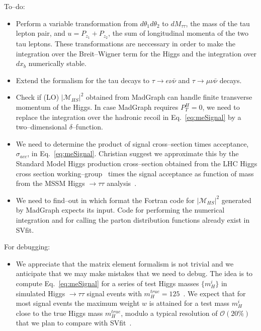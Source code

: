 To--do:
\begin{itemize}
\item Perform a variable transformation from $d\theta_{1} d\theta_{2}$ to $dM_{\tau\tau}$, the mass of the tau lepton pair,
  and $u = P_{z_{1}} + P_{z_{2}}$, the sum of longitudinal momenta of the two tau leptons.
  These transformations are neccessary in order to make the integration over the Breit--Wigner term for the Higgs and the integration over $dx_{b}$ numerically stable.
\item Extend the formalism for the tau decays to $\tau \rightarrow e \nu\bar{\nu}$ and $\tau \rightarrow \mu \nu\bar{\nu}$ decays.
\item Check if (LO) $\vert \mathcal{M}_{HS} \vert^2$ obtained from MadGraph can handle finite transverse momentum of the Higgs.
  In case MadGraph requires $P_{T}^{H} = 0$, we need to replace the integration over the hadronic recoil in Eq.~\ref{eq:meSignal} by a two--dimensional $\delta$--function.
\item We need to determine the product of signal cross--section times acceptance, $\sigma_{acc}$, in Eq.~\ref{eq:meSignal}.
  Christian suggest we approximate this by the Standard Model Higgs production cross--section obtained from the LHC Higgs cross section working--group~\cite{LHCHiggsCrossSectionWorkingGroup:2011ti}
  times the signal acceptance as function of mass from the MSSM Higgs $\rightarrow \tau\tau$ analysis~\cite{CMS_AN_2013-171}.
\item We need to find--out in which format the Fortran code for $\vert \mathcal{M}_{HS} \vert^2$ generated by MadGraph expects its input.
  Code for performing the numerical integration and for calling the parton distribution functions already exist in SVfit.
\end{itemize}

For debugging:
\begin{itemize}
\item We appreciate that the matrix element formalism is not trivial and we anticipate that we may make mistakes that we need to debug.
  The idea is to compute Eq.~\ref{eq:meSignal} for a series of test Higgs masses $\{ m_{H}^{i} \}$ in simulated Higgs $\rightarrow \tau\tau$ signal events with $m_{H}^{true} = 125$~\GeV.
  We expect that for most signal events the maximum weight $w$ is attained for a test mass $m_{H}^{i}$ close to the true Higgs mass $m_{H}^{true}$,
  modulo a typical resolution of $\mathcal{O}(20\%)$ that we plan to compare with SVfit~\cite{Bianchini:2014vza}.
\end{itemize}





